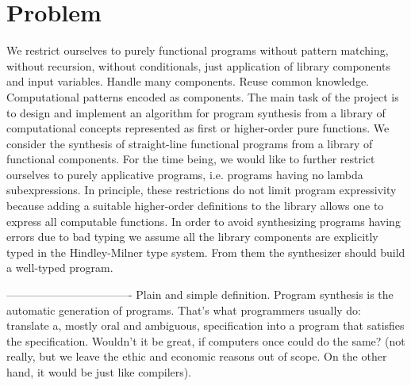 \section{Problem}
We restrict ourselves to purely functional programs without pattern matching, without recursion, without conditionals, just application of library components and input variables. Handle many components. Reuse common knowledge. Computational patterns encoded as components.
The main task of the project is to design and implement an algorithm for program synthesis from a library of computational concepts represented as first or higher-order pure functions.
We consider the synthesis of straight-line functional programs from a library of functional components.  For the time being, we would like to further restrict ourselves to purely applicative programs, i.e. programs having no lambda subexpressions. In principle, these restrictions do not limit program expressivity because adding a suitable higher-order definitions to the library allows one to express all computable functions.  In order to avoid synthesizing programs having errors due to bad typing we assume all the library components are explicitly typed in the Hindley-Milner type system.  From them the synthesizer should build a well-typed program.






----------------------------------
Plain and simple definition. Program synthesis is the automatic generation of programs. That's what programmers usually do: translate a, mostly oral and ambiguous, specification into a program that satisfies the specification. Wouldn't it be great, if computers once could do the same? (not really, but we leave the ethic and economic reasons out of scope. On the other hand, it would be just like compilers).

